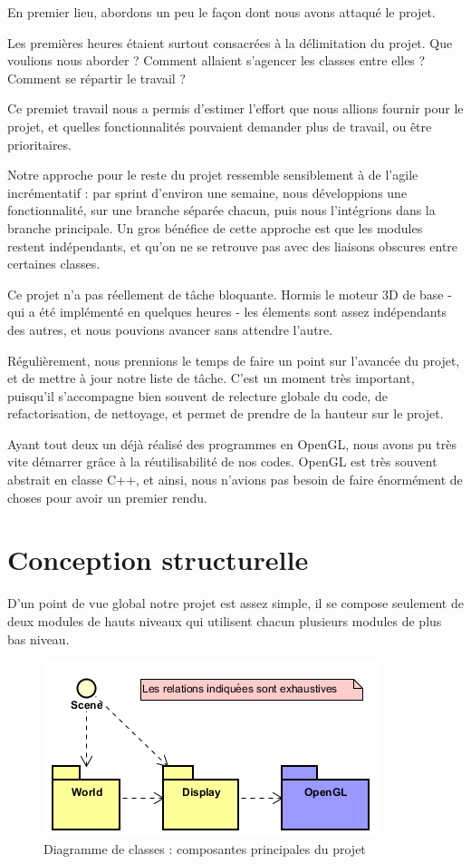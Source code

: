 \documentclass{EPUProjetDi}
\begin{document}
En premier lieu, abordons un peu le façon dont nous avons attaqué le projet.

Les premières heures étaient surtout consacrées à la délimitation du projet. Que voulions nous aborder ? Comment allaient s'agencer les classes entre elles ? Comment se répartir le travail ?

Ce premiet travail nous a permis d'estimer l'effort que nous allions fournir pour le projet, et quelles fonctionnalités pouvaient demander plus de travail, ou être prioritaires.

Notre approche pour le reste du projet ressemble sensiblement à de l'agile incrémentatif : par sprint d'environ une semaine, nous développions une fonctionnalité, sur une branche séparée chacun, puis nous l'intégrions dans la branche principale. Un gros bénéfice de cette approche est que les modules restent indépendants, et qu'on ne se retrouve pas avec des liaisons obscures entre certaines classes. 

Ce projet n'a pas réellement de tâche bloquante. Hormis le moteur 3D de base - qui a été implémenté en quelques heures - les élements sont assez indépendants des autres, et nous pouvions avancer sans attendre l'autre.

Régulièrement, nous prennions le temps de faire un point sur l'avancée du projet, et de mettre à jour notre liste de tâche. C'est un moment très important, puisqu'il s'accompagne bien souvent de relecture globale du code, de refactorisation, de nettoyage, et permet de prendre de la hauteur sur le projet.


Ayant tout deux un déjà réalisé des programmes en OpenGL, nous avons pu très vite démarrer grâce à la réutilisabilité de nos codes. OpenGL est très souvent abstrait en classe C++, et ainsi, nous n'avions pas besoin de faire énormément de choses pour avoir un premier rendu.


\section{Conception structurelle}

D'un point de vue global notre projet est assez simple, il se compose seulement de deux modules de hauts niveaux qui utilisent chacun plusieurs modules de plus bas niveau.

\begin{figure}[ht]
	\centering
	\includegraphics[scale=.6]{overview_uml}
	\caption{Diagramme de classes : composantes principales du projet}
\end{figure}
\end{document}
